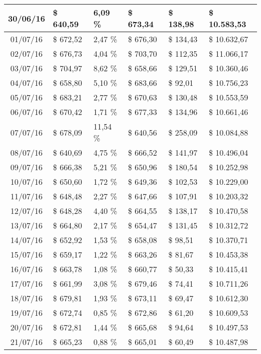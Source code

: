 \begin{small}
\begin{longtable}{|c|l|l|l|l|l|}
30/06/16 & \$ 640,59 & 6,09 \% & \$ 673,34 & \$ 138,98 & \$ 10.583,53 \\ \hline
01/07/16 & \$ 672,52 & 2,47 \% & \$ 676,30 & \$ 134,43 & \$ 10.632,67 \\ \hline
02/07/16 & \$ 676,73 & 4,04 \% & \$ 703,70 & \$ 112,35 & \$ 11.066,17 \\ \hline
03/07/16 & \$ 704,97 & 8,62 \% & \$ 658,66 & \$ 129,51 & \$ 10.360,46 \\ \hline
04/07/16 & \$ 658,80 & 5,10 \% & \$ 683,66 & \$ 92,01 & \$ 10.756,23 \\ \hline
05/07/16 & \$ 683,21 & 2,77 \% & \$ 670,63 & \$ 130,48 & \$ 10.553,59 \\ \hline
06/07/16 & \$ 670,42 & 1,71 \% & \$ 677,33 & \$ 134,96 & \$ 10.661,46 \\ \hline
07/07/16 & \$ 678,09 & 11,54 \% & \$ 640,56 & \$ 258,09 & \$ 10.084,88 \\ \hline
08/07/16 & \$ 640,69 & 4,75 \% & \$ 666,52 & \$ 141,97 & \$ 10.496,04 \\ \hline
09/07/16 & \$ 666,38 & 5,21 \% & \$ 650,96 & \$ 180,54 & \$ 10.252,98 \\ \hline
10/07/16 & \$ 650,60 & 1,72 \% & \$ 649,36 & \$ 102,53 & \$ 10.229,00 \\ \hline
11/07/16 & \$ 648,48 & 2,27 \% & \$ 647,66 & \$ 107,91 & \$ 10.203,32 \\ \hline
12/07/16 & \$ 648,28 & 4,40 \% & \$ 664,55 & \$ 138,17 & \$ 10.470,58 \\ \hline
13/07/16 & \$ 664,80 & 2,17 \% & \$ 654,47 & \$ 131,45 & \$ 10.312,72 \\ \hline
14/07/16 & \$ 652,92 & 1,53 \% & \$ 658,08 & \$ 98,51 & \$ 10.370,71 \\ \hline
15/07/16 & \$ 659,17 & 1,22 \% & \$ 663,26 & \$ 81,67 & \$ 10.453,38 \\ \hline
16/07/16 & \$ 663,78 & 1,08 \% & \$ 660,77 & \$ 50,33 & \$ 10.415,41 \\ \hline
17/07/16 & \$ 661,99 & 3,08 \% & \$ 679,46 & \$ 74,41 & \$ 10.711,26 \\ \hline
18/07/16 & \$ 679,81 & 1,93 \% & \$ 673,11 & \$ 69,47 & \$ 10.612,30 \\ \hline
19/07/16 & \$ 672,74 & 0,85 \% & \$ 672,86 & \$ 61,20 & \$ 10.609,53 \\ \hline
20/07/16 & \$ 672,81 & 1,44 \% & \$ 665,68 & \$ 94,64 & \$ 10.497,53 \\ \hline
21/07/16 & \$ 665,23 & 0,88 \% & \$ 665,01 & \$ 60,49 & \$ 10.487,98 \\ \hline

\end{longtable}
\end{small}
